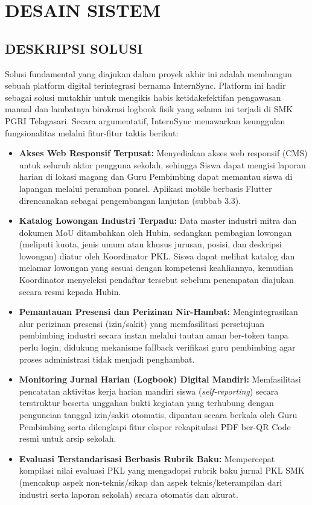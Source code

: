 \chapter{DESAIN SISTEM}

\section{DESKRIPSI SOLUSI}

Solusi fundamental yang diajukan dalam proyek akhir ini adalah membangun sebuah platform digital terintegrasi bernama InternSync. Platform ini hadir sebagai solusi mutakhir untuk mengikis habis ketidakefektifan pengawasan manual dan lambatnya birokrasi logbook fisik yang selama ini terjadi di SMK PGRI Telagasari. Secara argumentatif, InternSync menawarkan keunggulan fungsionalitas melalui fitur-fitur taktis berikut:

\begin{itemize}
\item \textbf{Akses Web Responsif Terpusat:} Menyediakan akses web responsif (CMS) untuk seluruh aktor pengguna sekolah, sehingga Siswa dapat mengisi laporan harian di lokasi magang dan Guru Pembimbing dapat memantau siswa di lapangan melalui peramban ponsel. Aplikasi mobile berbasis Flutter direncanakan sebagai pengembangan lanjutan (subbab 3.3).
\item \textbf{Katalog Lowongan Industri Terpadu:} Data master industri mitra dan dokumen MoU ditambahkan oleh Hubin, sedangkan pembagian lowongan (meliputi kuota, jenis umum atau khusus jurusan, posisi, dan deskripsi lowongan) diatur oleh Koordinator PKL. Siswa dapat melihat katalog dan melamar lowongan yang sesuai dengan kompetensi keahliannya, kemudian Koordinator menyeleksi pendaftar tersebut sebelum penempatan diajukan secara resmi kepada Hubin.
\item \textbf{Pemantauan Presensi dan Perizinan Nir-Hambat:} Mengintegrasikan alur perizinan presensi (izin/sakit) yang memfasilitasi persetujuan pembimbing industri secara instan melalui tautan aman ber-token tanpa perlu login, didukung mekanisme fallback verifikasi guru pembimbing agar proses administrasi tidak menjadi penghambat.
\item \textbf{Monitoring Jurnal Harian (Logbook) Digital Mandiri:} Memfasilitasi pencatatan aktivitas kerja harian mandiri siswa (\textit{self-reporting}) secara terstruktur beserta unggahan bukti kegiatan yang terhubung dengan penguncian tanggal izin/sakit otomatis, dipantau secara berkala oleh Guru Pembimbing serta dilengkapi fitur ekspor rekapitulasi PDF ber-QR Code resmi untuk arsip sekolah.
\item \textbf{Evaluasi Terstandarisasi Berbasis Rubrik Baku:} Mempercepat kompilasi nilai evaluasi PKL yang mengadopsi rubrik baku jurnal PKL SMK (mencakup aspek non-teknis/sikap dan aspek teknis/keterampilan dari industri serta laporan sekolah) secara otomatis dan akurat.
\end{itemize}

